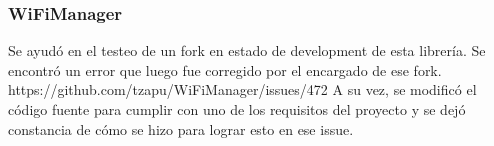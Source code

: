 \subsubsection{WiFiManager}

Se ayudó en el testeo de un fork en estado de development de esta librería. Se encontró un error que luego fue corregido por el encargado de ese fork. https://github.com/tzapu/WiFiManager/issues/472 A su vez, se modificó el código fuente para cumplir con uno de los requisitos del proyecto y se dejó constancia de cómo se hizo para lograr esto en ese issue.
